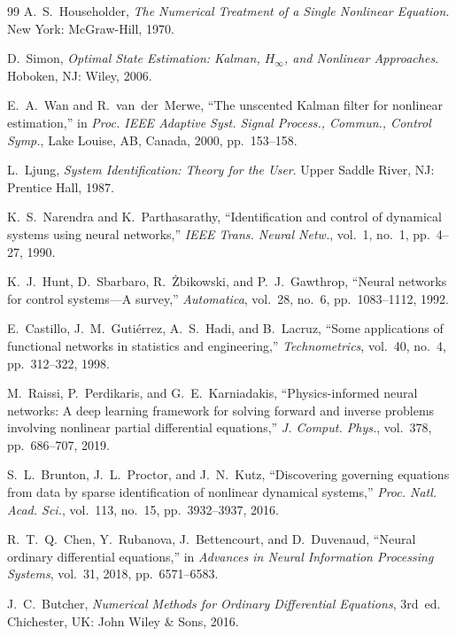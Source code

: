 \documentclass[lettersize,journal]{IEEEtran}
\begin{document}
\begin{thebibliography}{99}
A.~S.~Householder, \textit{The Numerical Treatment of a Single Nonlinear Equation}. New York: McGraw-Hill, 1970.

D.~Simon, \textit{Optimal State Estimation: Kalman, $H_\infty$, and Nonlinear Approaches}. Hoboken, NJ: Wiley, 2006.

E.~A.~Wan and R.~van~der~Merwe, ``The unscented Kalman filter for nonlinear estimation,'' in \textit{Proc. IEEE Adaptive Syst. Signal Process., Commun., Control Symp.}, Lake Louise, AB, Canada, 2000, pp.~153--158.

L.~Ljung, \textit{System Identification: Theory for the User}. Upper Saddle River, NJ: Prentice Hall, 1987.

K.~S.~Narendra and K.~Parthasarathy, ``Identification and control of dynamical systems using neural networks,'' \textit{IEEE Trans. Neural Netw.}, vol.~1, no.~1, pp.~4--27, 1990.

K.~J.~Hunt, D.~Sbarbaro, R.~\.Zbikowski, and P.~J.~Gawthrop, ``Neural networks for control systems---A survey,'' \textit{Automatica}, vol.~28, no.~6, pp.~1083--1112, 1992.

E.~Castillo, J.~M.~Guti\'errez, A.~S.~Hadi, and B.~Lacruz, ``Some applications of functional networks in statistics and engineering,'' \textit{Technometrics}, vol.~40, no.~4, pp.~312--322, 1998.

M.~Raissi, P.~Perdikaris, and G.~E.~Karniadakis, ``Physics-informed neural networks: A deep learning framework for solving forward and inverse problems involving nonlinear partial differential equations,'' \textit{J. Comput. Phys.}, vol.~378, pp.~686--707, 2019.

S.~L.~Brunton, J.~L.~Proctor, and J.~N.~Kutz, ``Discovering governing equations from data by sparse identification of nonlinear dynamical systems,'' \textit{Proc. Natl. Acad. Sci.}, vol.~113, no.~15, pp.~3932--3937, 2016.

R.~T.~Q.~Chen, Y.~Rubanova, J.~Bettencourt, and D.~Duvenaud, ``Neural ordinary differential equations,'' in \textit{Advances in Neural Information Processing Systems}, vol.~31, 2018, pp.~6571--6583.

J.~C.~Butcher, \textit{Numerical Methods for Ordinary Differential Equations}, 3rd~ed. Chichester, UK: John Wiley \& Sons, 2016.


\end{thebibliography}
\end{document}
